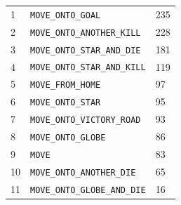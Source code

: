 \begin{table}[!htb]
\begin{minipage}[b]{.5\linewidth}
\begin{tabular}[t]{|l|l|l|}
			1  & \texttt{MOVE\_ONTO\_GOAL}&              235 \\
			2  & \texttt{MOVE\_ONTO\_ANOTHER\_KILL}&     228 \\
			3  & \texttt{MOVE\_ONTO\_STAR\_AND\_DIE}&    181 \\
			4  & \texttt{MOVE\_ONTO\_STAR\_AND\_KILL}&   119 \\
			5  & \texttt{MOVE\_FROM\_HOME}&              97 \\
			6  & \texttt{MOVE\_ONTO\_STAR}&              95 \\
			7  & \texttt{MOVE\_ONTO\_VICTORY\_ROAD}&     93 \\
			8  & \texttt{MOVE\_ONTO\_GLOBE}&             86 \\
			9 & \texttt{MOVE}&                          83 \\
			10 & \texttt{MOVE\_ONTO\_ANOTHER\_DIE}&      65 \\
			11 & \texttt{MOVE\_ONTO\_GLOBE\_AND\_DIE}&   16 \\ 
			\hline
		\end{tabular}
	\end{minipage} 
\end{table}

